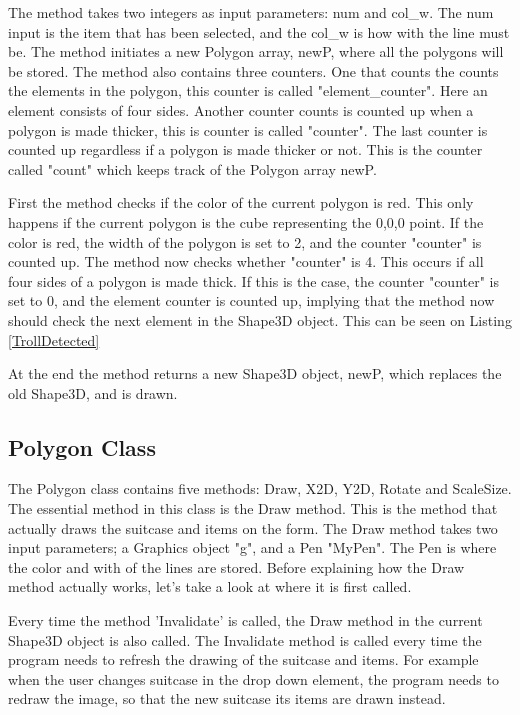 The method takes two integers as input parameters: num and col\_w. The num input is the item that has been selected, and the col\_w is how with the line must be. The method initiates a new Polygon array, newP, where all the polygons will be stored. The method also contains three counters. One that counts the counts the elements in the polygon, this counter is called "element\_counter". Here an element consists of four sides. Another counter counts is counted up when a polygon is made thicker, this is counter is called "counter". The last counter is counted up regardless if a polygon is made thicker or not. This is the counter called "count" which keeps track of the Polygon array newP.

First the method checks if the color of the current polygon is red. This only happens if the current polygon is the cube representing the 0,0,0 point. If the color is red, the width of the polygon is set to 2, and the counter "counter" is counted up. The method now checks whether "counter" is 4. This occurs if all four sides of a polygon is made thick. If this is the case, the counter "counter" is set to 0, and the element counter is counted up, implying that the method now should check the next element in the Shape3D object. This can be seen on Listing \ref{TrollDetected}


At the end the method returns a new Shape3D object, newP, which replaces the old Shape3D, and is drawn.

\subsection{Polygon Class} 
The Polygon class contains five methods: Draw, X2D, Y2D, Rotate and ScaleSize. The essential method in this class is the Draw method. This is the method that actually draws the suitcase and items on the form. The Draw method takes two input parameters; a Graphics object "g", and a Pen "MyPen". The Pen is where the color and with of the lines are stored. Before explaining how the Draw method actually works, let's take a look at where it is first called. 

Every time the method 'Invalidate' is called, the Draw method in the current Shape3D object is also called. The Invalidate method is called every time the program needs to refresh the drawing of the suitcase and items. For example when the user changes suitcase in the drop down element, the program needs to redraw the image, so that the new suitcase its items are drawn instead. 

